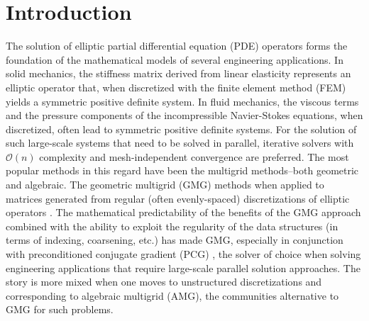 \section{Introduction}
\label{sec:intro}

The solution of elliptic partial differential equation (PDE) operators forms the 
foundation of the mathematical models of several engineering applications.
In solid mechanics, the stiffness matrix derived from linear elasticity represents an elliptic
operator that, when discretized with the finite element method (FEM) yields a symmetric positive
definite system. In fluid mechanics, the viscous terms and the pressure components of
the incompressible Navier-Stokes equations, when discretized, often lead to symmetric
positive definite systems. 
For the solution of such large-scale systems that need to be solved in parallel, iterative solvers 
with $\mathcal{O}(n)$ complexity and mesh-independent convergence are preferred. 
%
The most popular methods in this regard have been the multigrid methods--both geometric and algebraic. 
The geometric multigrid (GMG) methods when applied
to matrices generated from regular (often evenly-spaced) discretizations of elliptic operators \cite{MadayMunoz88,BrambleZhang00,Brenner02,GholamiMalhotraSundar2016}.
The mathematical predictability of the benefits of the GMG approach combined with the ability to
exploit the regularity of the data structures (in terms of indexing, coarsening, etc.) has made
GMG, especially in conjunction with preconditioned conjugate gradient (PCG) \cite{Braess86,TatebeOyanagi94}, the solver of choice when solving engineering applications that require large-scale
parallel solution approaches.  The story is more mixed when one moves to unstructured discretizations
and corresponding to algebraic multigrid (AMG), the communities alternative to GMG for such problems.  

